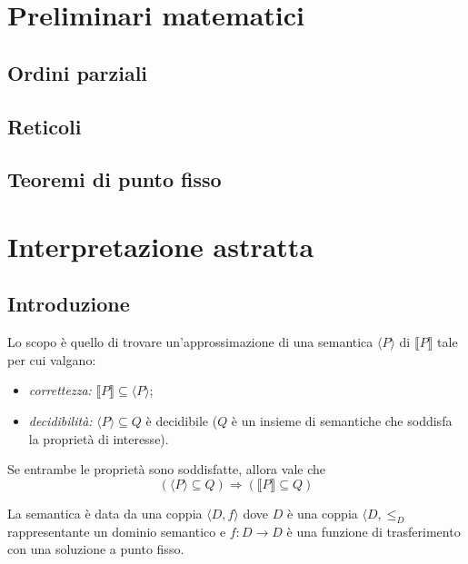 \documentclass[a4paper, 10pt]{article}
\begin{document}
	\begin{frontespizio}
		\Preambolo{\usepackage{datetime}}
		\Scuola{}
	\end{frontespizio}
	
	\tableofcontents
	\newpage


	\section{Preliminari matematici}
	\subsection{Ordini parziali}
	\subsection{Reticoli}
	\subsection{Teoremi di punto fisso}
	
	\section{Interpretazione astratta}
	\subsection{Introduzione}
	Lo scopo è quello di trovare un'approssimazione di una semantica $\langle P \rangle$ di $\llbracket P \rrbracket$ tale per cui valgano:
	\begin{itemize}
		\item \textit{correttezza:} $\llbracket P \rrbracket \subseteq \langle P \rangle$;
		\item \textit{decidibilità:} $\langle P \rangle \subseteq Q$ è decidibile ($Q$ è un insieme di semantiche che soddisfa la proprietà di interesse).
	\end{itemize}

	Se entrambe le proprietà sono soddisfatte, allora vale che \[ (\langle P \rangle \subseteq Q) \Rightarrow (\llbracket P \rrbracket \subseteq Q) \]
	
	La semantica è data da una coppia $\langle D, f \rangle$ dove $D$ è una coppia $\langle D, \leq_D$ rappresentante un dominio semantico e $f: D \to D$ è una funzione di trasferimento con una soluzione a punto fisso.
	
\end{document}
